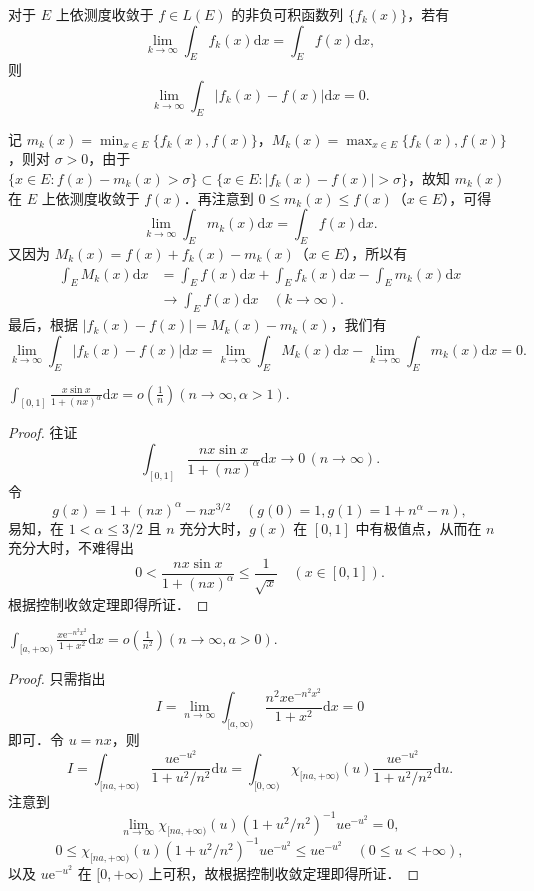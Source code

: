 \documentclass[../../main.tex]{subfiles}
\begin{document}
\begin{remark}
对于 \( E \) 上依测度收敛于 \( f \in L(E) \) 的非负可积函数列 \( \{ f_k(x) \} \)，若有
\[
\lim_{k \to \infty} \int_E f_k(x) \mathrm{d}x = \int_E f(x) \mathrm{d}x,
\]
则
\[
\lim_{k \to \infty} \int_E |f_k(x) - f(x)| \mathrm{d}x = 0.
\]

记 \( m_k(x) = \min_{x \in E} \{ f_k(x), f(x) \} \)，\( M_k(x) = \max_{x \in E} \{ f_k(x), f(x) \} \)，则对 \( \sigma > 0 \)，由于 \( \{ x \in E : f(x) - m_k(x) > \sigma \} \subset \{ x \in E : |f_k(x) - f(x)| > \sigma \} \)，故知 \( m_k(x) \) 在 \( E \) 上依测度收敛于 \( f(x) \)．再注意到 \( 0 \leqslant m_k(x) \leqslant f(x) \)（\( x \in E \)），可得
\[
\lim_{k \to \infty} \int_E m_k(x) \mathrm{d}x = \int_E f(x) \mathrm{d}x.
\]
又因为 \( M_k(x) = f(x) + f_k(x) - m_k(x) \)（\( x \in E \)），所以有
\begin{align*}
\int_E M_k(x) \mathrm{d}x &= \int_E f(x) \mathrm{d}x + \int_E f_k(x) \mathrm{d}x - \int_E m_k(x) \mathrm{d}x \\
&\to \int_E f(x) \mathrm{d}x \quad (k \to \infty).
\end{align*}
最后，根据 \( |f_k(x) - f(x)| = M_k(x) - m_k(x) \)，我们有
\[
\lim_{k \to \infty} \int_E |f_k(x) - f(x)| \mathrm{d}x = \lim_{k \to \infty} \int_E M_k(x) \mathrm{d}x - \lim_{k \to \infty} \int_E m_k(x) \mathrm{d}x = 0.
\]
\end{remark}

\begin{example}
$\int_{[0,1]} \frac{x\sin x}{1 + (nx)^\alpha} \mathrm{d}x = o\left( \frac{1}{n} \right) (n \to \infty, \alpha > 1).$
\end{example}
\begin{proof}
往证
\[
\int_{[0,1]} \frac{nx\sin x}{1 + (nx)^\alpha} \mathrm{d}x \to 0 \, (n \to \infty).
\]
令
\[
g(x) = 1 + (nx)^\alpha - nx^{3/2} \quad (g(0) = 1, g(1) = 1 + n^\alpha - n),
\]
易知，在 \(1 < \alpha \leqslant 3/2\) 且 \(n\) 充分大时，\(g(x)\) 在 \([0,1]\) 中有极值点，从而在 \(n\) 充分大时，不难得出
\[
0 < \frac{nx\sin x}{1 + (nx)^\alpha} \leqslant \frac{1}{\sqrt{x}} \quad (x \in [0,1]).
\]
根据控制收敛定理即得所证．
\end{proof}

\begin{example}
$\int_{[a, +\infty)} \frac{x\text{e}^{-n^2 x^2}}{1 + x^2} \mathrm{d}x = o\left( \frac{1}{n^2} \right) (n \to \infty, a > 0).$
\end{example}
\begin{proof}
只需指出
\[
I = \lim_{n \to \infty} \int_{[a, \infty)} \frac{n^2 x\text{e}^{-n^2 x^2}}{1 + x^2} \mathrm{d}x = 0
\]
即可．令 \(u = nx\)，则
\[
I = \int_{[na, +\infty)} \frac{u\text{e}^{-u^2}}{1 + u^2 / n^2} \mathrm{d}u = \int_{[0, \infty)} \chi_{[na, +\infty)}(u) \frac{u\text{e}^{-u^2}}{1 + u^2 / n^2} \mathrm{d}u.
\]
注意到
\[
\lim_{n \to \infty} \chi_{[na, +\infty)}(u) (1 + u^2 / n^2)^{-1} u\text{e}^{-u^2} = 0,
\]
\[
0 \leqslant \chi_{[na, +\infty)}(u) (1 + u^2 / n^2)^{-1} u\text{e}^{-u^2} \leqslant u\text{e}^{-u^2} \quad (0 \leqslant u < +\infty),
\]
以及 \(u\text{e}^{-u^2}\) 在 \([0, +\infty)\) 上可积，故根据控制收敛定理即得所证．
\end{proof}
\end{document}
